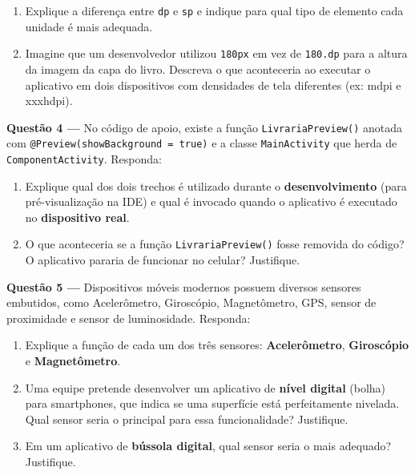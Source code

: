 \documentclass[12pt,a4paper]{article}
\newcommand{\resposta}[1]{
\noindent
\framebox[\textwidth]{
\begin{minipage}{0.98\textwidth}
\vspace*{#1}\null
\end{minipage}
}
}
\begin{document}
\begin{enumerate}[label=\alph*)]
    \item Explique a diferença entre \texttt{dp} e \texttt{sp} e indique para qual tipo de elemento cada unidade é mais adequada.
    \item Imagine que um desenvolvedor utilizou \texttt{180px} em vez de \texttt{180.dp} para a altura da imagem da capa do livro. Descreva o que aconteceria ao executar o aplicativo em dois dispositivos com densidades de tela diferentes (ex: mdpi e xxxhdpi).
\end{enumerate}

\vspace{0.3cm}
\resposta{7cm}

\vspace{0.5cm}

\textbf{Questão 4 —} No código de apoio, existe a função \texttt{LivrariaPreview()} anotada com \texttt{@Preview(showBackground = true)} e a classe \texttt{MainActivity} que herda de \texttt{ComponentActivity}. Responda:

\begin{enumerate}[label=\alph*)]
    \item Explique qual dos dois trechos é utilizado durante o \textbf{desenvolvimento} (para pré-visualização na IDE) e qual é invocado quando o aplicativo é executado no \textbf{dispositivo real}.
    \item O que aconteceria se a função \texttt{LivrariaPreview()} fosse removida do código? O aplicativo pararia de funcionar no celular? Justifique.
\end{enumerate}

\vspace{0.3cm}
\resposta{6cm}

\vspace{0.5cm}

\textbf{Questão 5 —} Dispositivos móveis modernos possuem diversos sensores embutidos, como Acelerômetro, Giroscópio, Magnetômetro, GPS, sensor de proximidade e sensor de luminosidade. Responda:

\begin{enumerate}[label=\alph*)]
    \item Explique a função de cada um dos três sensores: \textbf{Acelerômetro}, \textbf{Giroscópio} e \textbf{Magnetômetro}.
    \item Uma equipe pretende desenvolver um aplicativo de \textbf{nível digital} (bolha) para smartphones, que indica se uma superfície está perfeitamente nivelada. Qual sensor seria o principal para essa funcionalidade? Justifique.
    \item Em um aplicativo de \textbf{bússola digital}, qual sensor seria o mais adequado? Justifique.
\end{enumerate}
\end{document}
